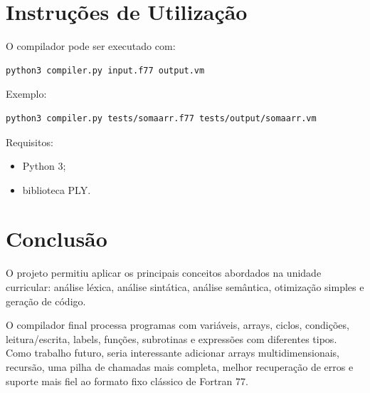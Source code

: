 \documentclass[11pt,a4paper]{article}
\begin{document}
\section{Instruções de Utilização}

O compilador pode ser executado com:

\begin{lstlisting}
python3 compiler.py input.f77 output.vm
\end{lstlisting}

Exemplo:

\begin{lstlisting}
python3 compiler.py tests/somaarr.f77 tests/output/somaarr.vm
\end{lstlisting}

Requisitos:

\begin{itemize}
    \item Python 3;
    \item biblioteca PLY.
\end{itemize}

\section{Conclusão}

O projeto permitiu aplicar os principais conceitos abordados na unidade curricular: análise léxica, análise sintática, análise semântica, otimização simples e geração de código.

O compilador final processa programas com variáveis, arrays, ciclos, condições, leitura/escrita, labels, funções, subrotinas e expressões com diferentes tipos. Como trabalho futuro, seria interessante adicionar arrays multidimensionais, recursão, uma pilha de chamadas mais completa, melhor recuperação de erros e suporte mais fiel ao formato fixo clássico de Fortran 77.
\end{document}
